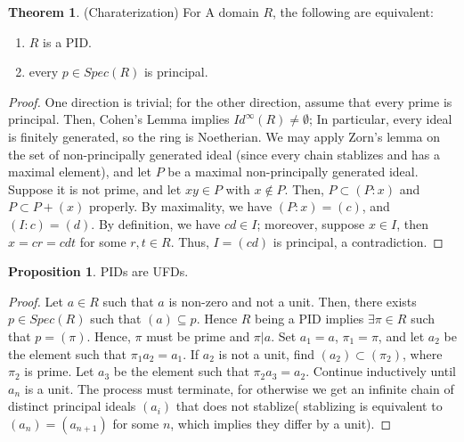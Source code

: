 \documentclass{article}
\theoremstyle{definition}
\newtheorem{theorem}{Theorem}[section]
\theoremstyle{definition}
\theoremstyle{definition}
\newtheorem{proposition}{Proposition}[section]
\theoremstyle{definition}
\theoremstyle{definition}
\theoremstyle{definition}
\theoremstyle{definition}
\begin{document}
\begin{tcolorbox}[colback=red!5!white,colframe=red!30!white]
\begin{theorem}
    (Charaterization) For A domain $R$, the following are equivalent: 
\begin{enumerate}
    \item  $R$ is a PID.
    \item every $p\in Spec(R)$ is principal. 
\end{enumerate}
\end{theorem}
\end{tcolorbox}
\begin{proof}
    One direction is trivial; for the other direction, assume that every prime is principal. Then, Cohen's Lemma implies $Id^{\infty}(R)\neq \emptyset$; In particular, every ideal is finitely generated, so the ring is Noetherian. We may apply Zorn's lemma on the set of non-principally generated ideal (since every chain stablizes and has a maximal element), and let $P$ be a maximal non-principally generated ideal. Suppose it is not prime, and let $xy\in P$ with $x\not \in P$. Then, $P\subset (P:x)$ and $P\subset P+(x)$ properly. By maximality, we have $(P:x)=(c)$, and $(I:c)=(d)$. By definition, we have $cd\in I$; moreover, suppose $x\in I$, then $x=cr=cdt$ for some $r,t\in R$. Thus, $I=(cd)$ is principal, a contradiction.  
\end{proof}


\begin{tcolorbox}[colback=blue!5!white,colframe=blue!30!white]
\begin{proposition}
PIDs are UFDs.
\end{proposition}
\end{tcolorbox}


\begin{proof}
    Let $a\in R$ such that $a$ is non-zero and not a unit. Then, there exists $p\in Spec(R)$ such that $(a)\subseteq p$. Hence $R$ being a PID implies $\exists \pi\in R $ such that $p=(\pi)$. Hence, $\pi$ must be prime and $\pi|a$. Set $a_1=a$, $\pi_1=\pi$, and let $a_2$ be the element such that $\pi_1a_2=a_1$. If $a_2$ is not a unit, find $(a_2)\subset (\pi_2)$, where $\pi_2$ is prime. Let $a_3$ be the element such that $\pi_2a_3=a_2$. Continue inductively until $a_n$ is a unit. The process must terminate, for otherwise we get an infinite chain of distinct principal ideals $(a_i)$ that does not stablize( stablizing is equivalent to $(a_n)=(a_{n+1})$ for some $n$, which implies they differ by a unit).
\end{proof}
\end{document}
